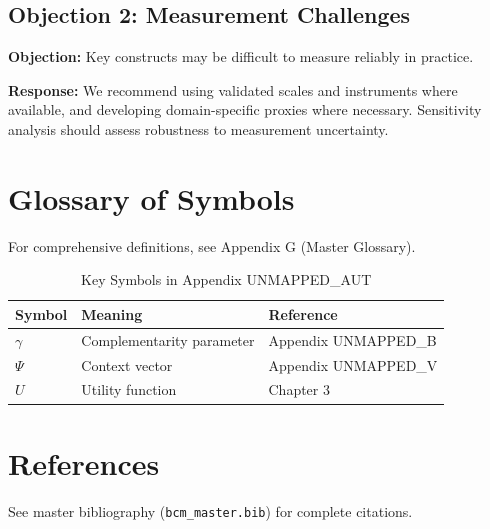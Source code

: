 \subsection{Objection 2: Measurement Challenges}

\textbf{Objection:} Key constructs may be difficult to measure reliably in
practice.

\textbf{Response:} We recommend using validated scales and instruments where
available, and developing domain-specific proxies where necessary. Sensitivity
analysis should assess robustness to measurement uncertainty.



\section{Glossary of Symbols}
\label{sec:aut-glossary}

For comprehensive definitions, see Appendix G (Master Glossary).

\begin{table}[htbp]
\centering
\caption{Key Symbols in Appendix UNMAPPED_AUT}
\begin{tabular}{lll}
\toprule
\textbf{Symbol} & \textbf{Meaning} & \textbf{Reference} \\
\midrule
$\gamma$ & Complementarity parameter & Appendix UNMAPPED_B \\
$\Psi$ & Context vector & Appendix UNMAPPED_V \\
$U$ & Utility function & Chapter 3 \\
\bottomrule
\end{tabular}
\end{table}


\section{References}
\label{sec:aut-references}

See master bibliography (\texttt{bcm\_master.bib}) for complete citations.

\nocite{bcm_master}

